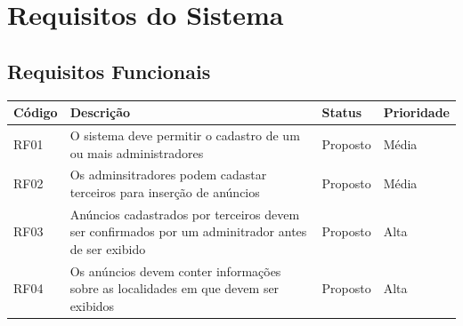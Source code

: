 \documentclass[a4paper, 12pt]{article}
\begin{document}
\section{Requisitos do Sistema}
\subsection{Requisitos Funcionais}
\begin{table}[ht]
	\centering

	\begin{tabular}{p{2cm}p{7cm}p{2cm}p{2cm}}
		\hline
		\cellcolor{gray}Código&\cellcolor{gray}Descrição&\cellcolor{gray}Status&\cellcolor{gray}Prioridade  \\
		\hline
		RF01&O sistema deve permitir o cadastro de um ou mais administradores&Proposto&M\'{e}dia\\
        RF02&Os adminsitradores podem cadastar terceiros para inser\c{c}\~{a}o de an\'{u}ncios&Proposto&M\'{e}dia\\
        RF03&An\'{u}ncios cadastrados por terceiros devem ser confirmados por um adminitrador antes de ser exibido&Proposto&Alta\\
        RF04&Os an\'{u}ncios devem conter informa\c{c}\~{o}es sobre as localidades em que devem ser exibidos&Proposto&Alta\\
    \end{tabular}
\end{table}%
\end{document}
